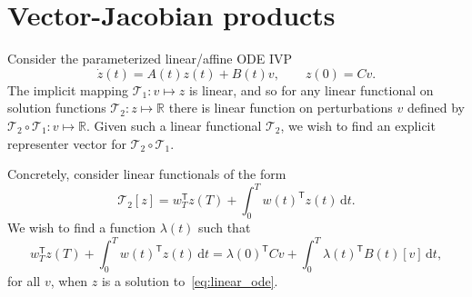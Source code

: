 \documentclass{article}
\begin{document}
\section{Vector-Jacobian products}
Consider the parameterized linear/affine ODE IVP
\begin{equation}
    \dot z(t) = A(t) z(t) + B(t) v, \qquad z(0) = C v.
    \label{eq:linear_ode}
\end{equation}
The implicit mapping $\mathcal{T}_1: v \mapsto z$ is linear, and so for any
linear functional on solution functions $\mathcal{T}_2 : z \mapsto \mathbb{R}$
there is linear function on perturbations $v$ defined by $\mathcal{T}_2 \circ
\mathcal{T}_1 : v \mapsto \mathbb{R}$. Given such a linear functional
$\mathcal{T}_2$, we wish to find an explicit representer vector for
$\mathcal{T}_2 \circ \mathcal{T}_1$.

Concretely, consider linear functionals of the form
\begin{equation}
    \mathcal{T}_2[z] = w_T^\mathsf{T} z(T) + \int_0^T w(t)^\mathsf{T} z(t) \, \mathrm{d}t.
    \label{eq:functional}
\end{equation}
We wish to find a function $\lambda(t)$ such that
\begin{equation}
    w_T^\mathsf{T} z(T) + \int_0^T w(t)^\mathsf{T} z(t) \, \mathrm{d}t
    =
    \lambda(0)^\mathsf{T} C v + \int_0^T \lambda(t)^\mathsf{T} B(t)[v] \, \mathrm{d}t,
\end{equation}
for all $v$, when $z$ is a solution to~\eqref{eq:linear_ode}.
\end{document}
